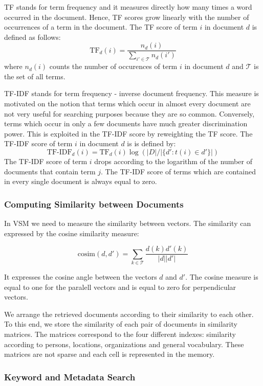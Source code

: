 TF stands for term frequency and it measures directly how many times a word occurred in the document. Hence, TF scores grow linearly with the number of occurrences of a term in the document. The TF score of term $i$ in document $d$ is defined as follows:
\[\text{TF}_d(i) = \frac{n_d(i)}{\sum_{i' \in \mathcal{T}}{n_d(i')}}\]
where $n_d(i)$ counts the number of occurences of term $i$ in document $d$ and $\mathcal{T}$ is the set of all terms. 

TF-IDF stands for term frequency - inverse document frequency. This measure is motivated on the notion that terms which occur in almost every document are not very useful for searching purposes because they are so common. Conversely, terms which occur in only a few documents have much greater discrimination power. This is exploited in the TF-IDF score by reweighting the TF score. The TF-IDF score of term $i$ in document $d$ is is defined by:
\[\text{TF-IDF}_d(i)= \text{TF}_d(i)\log{(|D|/|\lbrace d' : t(i) \in d' \rbrace|)}\]
The TF-IDF score of term $i$ drops according to the logarithm of the number of documents that contain term $j$. The TF-IDF score of terms which are contained in every single document is always equal to zero.

\subsubsection{Computing Similarity between Documents}\label{sec:computing_similarity_between_documents}

In VSM we need to measure the similarity between vectors. The similarity can expressed by the cosine similarity measure:

\[\text{cosim}(d,d') = \sum_{k \in \mathcal{T}}\frac{d(k)d'(k)}{|d||d'|}\]

It expresses the cosine angle between the vectors $d$ and $d'$. The cosine measure is equal to one for the paralell vectors and is equal to zero for perpendicular vectors.

We arrange the retrieved documents according to their similarity to each other. To this end, we store the similarity of each pair of documents in similarity matrices. The matrices correspond to the four different indexes: similarity according to persons, locations, organizations and general vocabulary. These matrices are not sparse and each cell is represented in the memory.   

\subsubsection{Keyword and Metadata Search}\label{sec:keyword_search}


